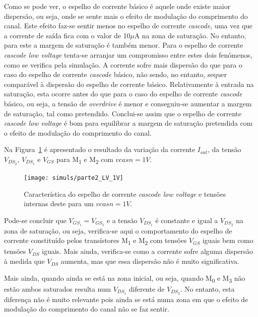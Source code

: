 \documentclass[11pt]{article}
\numberwithin{equation}{section}
\begin{document}
Como se pode ver, o espelho de corrente básico é aquele onde existe maior dispersão, ou seja, onde se sente mais o efeito de modulação do comprimento do canal. Este efeito faz-se sentir menos no espelho de corrente \textit{cascode}, uma vez que a corrente de saída fica com o valor de 10$\mu$A na zona de saturação. No entanto, para este a margem de saturação é também menor. Para o espelho de corrente \textit{cascode low voltage} tenta-se arranjar um compromisso entre estes dois fenómenos, como se verifica pela simulação. A corrente sofre mais dispersão do que para o caso do espelho de corrente \textit{cascode} básico, não sendo, no entanto, sequer comparável à dispersão do espelho de corrente básico. Relativamente à entrada na saturação, esta ocorre antes do que para o caso do espelho de corrente \textit{cascode} básico, ou seja, a tensão de \textit{overdrive} é menor e conseguiu-se aumentar a margem de saturação, tal como pretendido. Conclui-se assim que o espelho de corrente \textit{cascode low voltage} é bom para equilibrar a margem de saturação pretendida com o efeito de modulação do comprimento do canal.

Na Figura~\ref{fig:parte2_lv_1v} é apresentado o resultado da variação da corrente $I_{out}$, da tensão $V_{DS_2}$, $V_{DS_1}$ e $V_{GS}$ para M\textsubscript{1} e M\textsubscript{2} com $vcasn = 1V$. 

\begin{figure}[H]
	\centering
	\texttt{[image: simuls/parte2\_LV\_1V]}
	\vspace{-0.8em}
	\caption{Característica do espelho de corrente \textit{cascode low voltage} e tensões internas deste para um $vcasn = 1V$.}
	\label{fig:parte2_lv_1v}
	\vspace{-0.8em}
\end{figure}

Pode-se concluir que $V_{GS_1} = V_{GS_2}$ e a tensão $V_{DS_1}$ é constante e igual a $V_{DS_2}$ na zona de saturação, ou seja, verifica-se aqui o comportamento do espelho de corrente constituído pelos transístores M\textsubscript{1} e M\textsubscript{2} com tensões $V_{GS}$ iguais bem como tensões $V_{DS}$ iguais. Mais ainda, verifica-se como a corrente sofre alguma dispersão à medida que $V_{DS}$ aumenta, mas que essa dispersão não é muito significativa. 

Mais ainda, quando ainda se está na zona inicial, ou seja, quando M\textsubscript{0} e M\textsubscript{3} não estão ambos saturados resulta num $V_{DS_{1}}$ diferente de $V_{DS_{2}}$. No entanto, esta diferença não é muito relevante pois ainda se está numa zona em que o efeito de modulação do comprimento do canal não se faz sentir.
\end{document}
